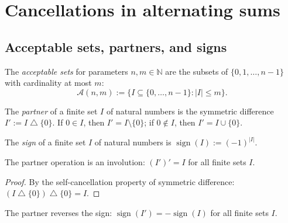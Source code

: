 \section{Cancellations in alternating sums}

\subsection{Acceptable sets, partners, and signs}

\begin{definition}
\label{def.acceptableSets}
\leanhelper
\leanok
The \emph{acceptable sets} for parameters $n, m \in \mathbb{N}$ are the
subsets of $\{0, 1, \ldots, n-1\}$ with cardinality at most $m$:
\[
\mathcal{A}(n, m) := \bigl\{I \subseteq \{0, \ldots, n-1\} : |I| \leq m\bigr\}.
\]
\end{definition}

\begin{definition}
\label{def.partner}
\leanhelper
\leanok
The \emph{partner} of a finite set $I$ of natural numbers is the
symmetric difference $I' := I \bigtriangleup \{0\}$.
If $0 \in I$, then $I' = I \setminus \{0\}$;
if $0 \notin I$, then $I' = I \cup \{0\}$.
\end{definition}

\begin{definition}
\label{def.setSign}
\leanhelper
\leanok
The \emph{sign} of a finite set $I$ of natural numbers is
$\operatorname{sign}(I) := (-1)^{|I|}$.
\end{definition}

\begin{lemma}
\label{lem.partner_partner}
\leanhelper
\leanok
The partner operation is an involution:
$(I')' = I$ for all finite sets $I$.
\end{lemma}

\begin{proof}
\leanok
By the self-cancellation property of symmetric difference:
$(I \bigtriangleup \{0\}) \bigtriangleup \{0\} = I$.
\end{proof}

\begin{lemma}
\label{lem.partner_sign}
\leanhelper
\leanok
The partner reverses the sign:
$\operatorname{sign}(I') = -\operatorname{sign}(I)$ for all finite
sets $I$.
\end{lemma}

